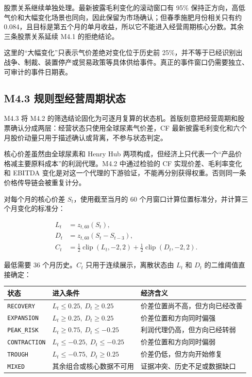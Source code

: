 \documentclass[11pt,a4paper]{ctexart}
\begin{document}
股票关系继续单独处理。最新披露毛利变化的滚动窗口有 95\% 保持正方向，高低气价和大幅变化场景也同向，因此保留为市场确认；但春季施肥月份相关只有约 0.084，且目标是第五个月的单月收益，所以它不能进入经营周期核心分数。其余三条股票关系延续 M4.1 的拒绝结论。

这里的“大幅变化”只表示气价差绝对变化位于历史前 25\%，并不等于已经识别出战争、制裁、装置停产或贸易政策等具体供给事件。真正的事件窗口仍需要独立、可审计的事件日期表。

\subsection{M4.3 规则型经营周期状态}

M4.3 将 M4.2 的筛选结论固化为可逐月复算的状态机。首版刻意把经营周期和股票确认分成两层：经营状态只使用全球尿素气价差，CF 最新披露毛利变化和六个月股价动量只用于描述确认或背离，不参与状态判定。

核心价差虽然由全球尿素和 Henry Hub 两项构成，但经济上只代表一个“产品价格减主要原料成本”的利润代理。M4.2 中通过检验的 CF 实现价差、毛利率变化和 EBITDA 变化是对这一个代理的下游验证，不能再分别获得权重。否则同一条价格传导链会被重复计分。

对每个月的核心价差 $S_t$，使用截至当月的 60 个月窗口计算位置标准分，并计算三个月变化的标准分：

\begin{align*}
L_t &= z_{t,60}(S_t), \\
D_t &= z_{t,60}(S_t-S_{t-3}), \\
C_t &= \frac{1}{2}\operatorname{clip}(L_t,-2,2)
     + \frac{1}{2}\operatorname{clip}(D_t,-2,2).
\end{align*}

最低需要 36 个月历史。$C_t$ 只用于连续展示，离散状态由 $L_t$ 和 $D_t$ 的二维阈值直接确定：

\begin{center}
\small
\begin{tabularx}{\textwidth}{L{2.8cm}L{4.5cm}Y}
\toprule
状态 & 进入条件 & 经济含义 \\
\midrule
\texttt{RECOVERY} & $L_t\leq0.25,\ D_t\geq0.25$ & 价差位置尚不高，但方向已经改善 \\
\texttt{EXPANSION} & $L_t\geq0.25,\ D_t\geq0.25$ & 价差位置和方向同时偏强 \\
\texttt{PEAK\_RISK} & $L_t\geq0.75,\ D_t\leq-0.25$ & 利润代理仍高，但方向已经转弱 \\
\texttt{CONTRACTION} & $L_t\leq-0.25,\ D_t\leq-0.25$ & 价差位置和方向同时偏弱 \\
\texttt{TROUGH} & $L_t\leq-0.75,\ D_t\geq0.25$ & 价差仍低，但方向开始修复 \\
\texttt{MIXED} & 其余组合或核心数据不可用 & 证据冲突、历史不足或数据缺口 \\
\bottomrule
\end{tabularx}
\normalsize
\end{center}
\end{document}
